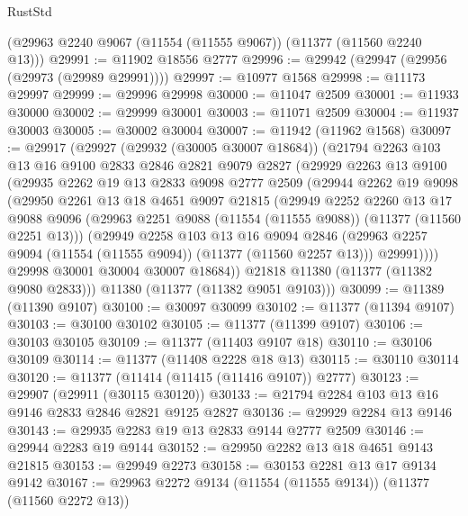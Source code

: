 \begin{lexlean}{RustStd}
\begin{coremodule}
    (@29963 @2240 @9067 (@11554 (@11555 @9067)) (@11377 (@11560 @2240 @13)))
@29991 := @11902 @18556 @2777
@29996 := @29942 (@29947 (@29956 (@29973 (@29989 @29991))))
@29997 := @10977 @1568
@29998 := @11173 @29997
@29999 := @29996 @29998
@30000 := @11047 @2509
@30001 := @11933 @30000
@30002 := @29999 @30001
@30003 := @11071 @2509
@30004 := @11937 @30003
@30005 := @30002 @30004
@30007 := @11942 (@11962 @1568)
@30097 := @29917
    (@29927
      (@29932 (@30005 @30007 @18684))
      (@21794
        @2263
        @103
        @13
        @16
        @9100
        @2833
        @2846
        @2821
        @9079
        @2827
        (@29929
          @2263
          @13
          @9100
          (@29935
            @2262
            @19
            @13
            @2833
            @9098
            @2777
            @2509
            (@29944
              @2262
              @19
              @9098
              (@29950
                @2261
                @13
                @18
                @4651
                @9097
                @21815
                (@29949
                  @2252
                  @2260
                  @13
                  @17
                  @9088
                  @9096
                  (@29963 @2251 @9088 (@11554 (@11555 @9088)) (@11377 (@11560 @2251 @13)))
                  (@29949
                    @2258
                    @103
                    @13
                    @16
                    @9094
                    @2846
                    (@29963 @2257 @9094 (@11554 (@11555 @9094)) (@11377 (@11560 @2257 @13)))
                    @29991))))
            @29998
            @30001
            @30004
            @30007
            @18684))
        @21818
        @11380
        (@11377 (@11382 @9080 @2833)))
      @11380
      (@11377 (@11382 @9051 @9103)))
@30099 := @11389 (@11390 @9107)
@30100 := @30097 @30099
@30102 := @11377 (@11394 @9107)
@30103 := @30100 @30102
@30105 := @11377 (@11399 @9107)
@30106 := @30103 @30105
@30109 := @11377 (@11403 @9107 @18)
@30110 := @30106 @30109
@30114 := @11377 (@11408 @2228 @18 @13)
@30115 := @30110 @30114
@30120 := @11377 (@11414 (@11415 (@11416 @9107)) @2777)
@30123 := @29907 (@29911 (@30115 @30120))
@30133 := @21794 @2284 @103 @13 @16 @9146 @2833 @2846 @2821 @9125 @2827
@30136 := @29929 @2284 @13 @9146
@30143 := @29935 @2283 @19 @13 @2833 @9144 @2777 @2509
@30146 := @29944 @2283 @19 @9144
@30152 := @29950 @2282 @13 @18 @4651 @9143 @21815
@30153 := @29949 @2273
@30158 := @30153 @2281 @13 @17 @9134 @9142
@30167 := @29963 @2272 @9134 (@11554 (@11555 @9134)) (@11377 (@11560 @2272 @13))

\end{coremodule}
\end{lexlean}
